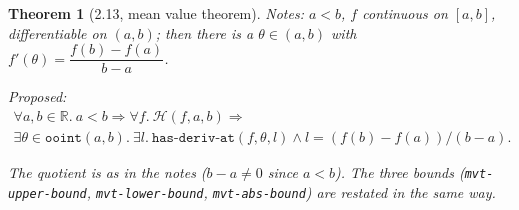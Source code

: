 \documentclass[11pt]{article}
\newtheorem{thm}{Theorem}
\theoremstyle{definition}
\newcommand{\vnb}[1]{\texttt{#1}}
\begin{document}
\begin{thm}[2.13, mean value theorem]
\emph{Notes:} $a < b$, $f$ continuous on $[a,b]$, differentiable on $(a,b)$; then there is a
$\theta \in (a,b)$ with $f'(\theta) = \dfrac{f(b) - f(a)}{b - a}$.

\emph{Proposed:}
\begin{gather*}
\forall a, b \in \mathbb{R}.\ a < b \Rightarrow \forall f.\ \mathcal{H}(f, a, b) \Rightarrow\\
\exists \theta \in \vnb{ooint}(a,b).\ \exists l.\ \vnb{has-deriv-at}(f, \theta, l) \wedge
l = (f(b) - f(a)) / (b - a).
\end{gather*}

The quotient is as in the notes ($b - a \neq 0$ since $a < b$). The three bounds
(\vnb{mvt-upper-bound}, \vnb{mvt-lower-bound}, \vnb{mvt-abs-bound}) are restated in the same way.
\end{thm}
\end{document}
